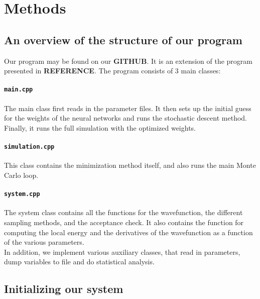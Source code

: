 \documentclass[a4paper, 10pt]{article}
\begin{document}
	\section{Methods}\label{Method_section}
	\subsection{An overview of the structure of our program}
	Our program may be found on our \textbf{GITHUB}. It is an extension of the program presented in \textbf{REFERENCE}. The program consists of $3$ main classes:
	\paragraph{\texttt{main.cpp}}
	The main class first reads in the parameter files. It then sets up the initial guess for the weights of the neural networks and runs the stochastic descent method. Finally, it runs the full simulation with the optimized weights.\\
	\paragraph{\texttt{simulation.cpp}}
	This class contains the minimization method itself, and also runs the main Monte Carlo loop.
	\paragraph{\texttt{system.cpp}}
	The system class contains all the functions for the wavefunction, the different sampling methods, and the acceptance check. It also contains the function for computing the local energy and the derivatives of the wavefunction as a function of the various parameters.\\
	\linebreak
	In addition, we implement various auxiliary classes, that read in parameters, dump variables to file and do statistical analysis.
	\subsection{Initializing our system}
\end{document}
